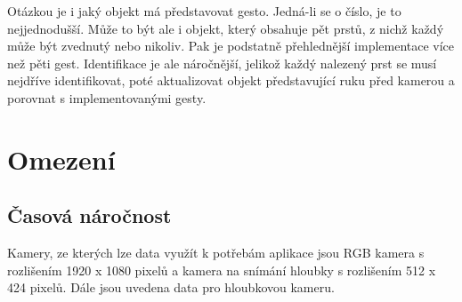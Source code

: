 Otázkou je i jaký objekt má představovat gesto. Jedná-li se o číslo, je to nejjednodušší. Může to být ale i objekt, který obsahuje pět prstů, z nichž každý může být zvednutý nebo nikoliv. Pak je podstatně přehlednější implementace více než pěti gest. Identifikace je ale náročnější, jelikož každý nalezený prst se musí nejdříve identifikovat, poté aktualizovat objekt představující ruku před kamerou a porovnat s implementovanými gesty. 

\section{Omezení}

\subsection{Časová náročnost}
Kamery, ze kterých lze data využít k potřebám aplikace jsou RGB kamera s rozlišením 1920 x 1080 pixelů a kamera na snímání hloubky s rozlišením 512 x 424 pixelů. Dále jsou uvedena data pro hloubkovou kameru.






